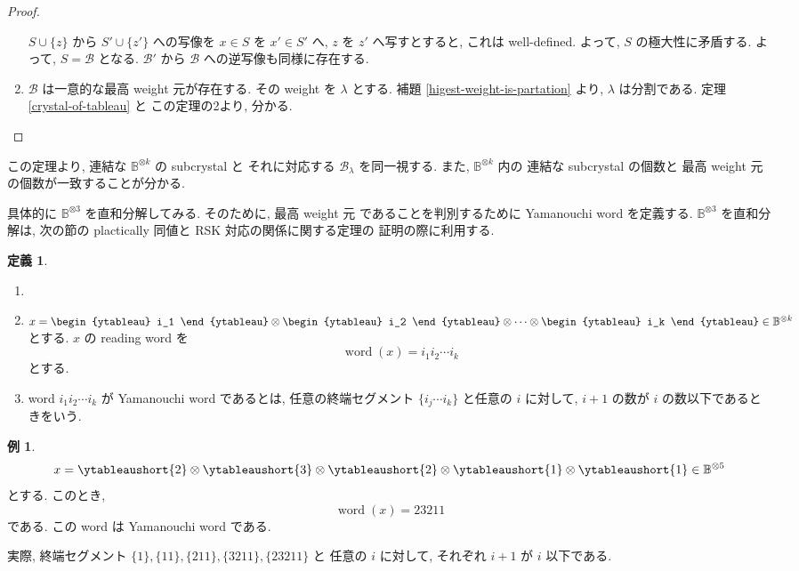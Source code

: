 \documentclass[
  a4paper, 
  12pt,
  ja=standard,
  xelatex,
  left=30truemm,
  right=30truemm,
  titlepage 
]{bxjsarticle}
\theoremstyle{definition}
\newtheorem{df}{定義}[section]
\newtheorem*{ex}{例}
\begin{document}
\begin{proof}
\begin{enumerate}
    $S \cup \{ z \}$ から $S' \cup \{ z' \}$ への写像を $x \in S$ を $x' \in S'$ へ,
    $z$ を $z'$ へ写すとすると, これは well-defined. よって, $S$ の極大性に矛盾する.
    よって, $S = \mathcal{B}$ となる. $\mathcal{B}'$ から $\mathcal{B}$ への逆写像も同様に存在する.
    \item $\mathcal{B}$ は一意的な最高 weight 元が存在する.
    その weight を $\lambda$ とする.
    補題 \ref{higest-weight-is-partation} より, $\lambda$ は分割である.
    定理 \ref{crystal-of-tableau} と この定理の2より, 分かる.
  \end{enumerate}
\end{proof}

この定理より, 連結な $\mathbb{B}^{ \otimes k}$ の subcrystal と
それに対応する $\mathcal{B}_{\lambda}$ を同一視する.
また, $\mathbb{B}^{ \otimes k}$ 内の 連結な subcrystal の個数と
最高 weight 元の個数が一致することが分かる.

具体的に $\mathbb{B}^{ \otimes 3}$ を直和分解してみる.
そのために, 最高 weight 元 であることを判別するために
Yamanouchi word を定義する.
$\mathbb{B}^{ \otimes 3}$ を直和分解は, 次の節の plactically 同値と RSK 対応の関係に関する定理の
証明の際に利用する.

\begin{df}
  \begin{enumerate}
    \item[]
    \item 
    $x =     
    \begin{ytableau} i_1 \end{ytableau} \otimes 
    \begin{ytableau} i_2 \end{ytableau} \otimes 
    \cdots \otimes 
    \begin{ytableau} i_k \end{ytableau}
    \in \mathbb{B}^{ \otimes k}
    $
    とする. $x$ の reading word を
    $$ \operatorname{word}(x) = i_1 i_2 \cdots i_k $$
    とする.
    \item word $i_1 i_2 \cdots i_k$ が Yamanouchi word であるとは, 
    任意の終端セグメント $ \{ i_j \cdots i_k \} $ と任意の $i$ に対して, 
    $i + 1$ の数が $i$ の数以下であるときをいう.
  \end{enumerate}
\end{df}

\begin{ex}
  \[
    x = \ytableaushort{2} \otimes \ytableaushort{3} \otimes \ytableaushort{2} \otimes \ytableaushort{1} \otimes \ytableaushort{1}
    \in \mathbb{B}^{\otimes 5}
  \]
  とする.
  このとき,
  \[
    \operatorname{word}(x) = 2 3 2 1 1
  \]
  である. この word は Yamanouchi word である.

  実際, 終端セグメント $\{ 1\}, \{ 1 1\}, \{ 2 1 1\}, \{ 3 2 1 1\}, \{ 2 3 2 1 1\}$ と 任意の $i$ に対して,
  それぞれ $i + 1$ が $i$ 以下である.
\end{ex}
\end{document}
